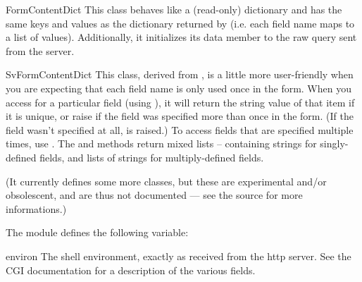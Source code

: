 \begin{funcdesc}{FormContentDict}{}
This class behaves like a (read-only) dictionary and has the same keys
and values as the dictionary returned by  (i.e. each
field name maps to a list of values).  Additionally, it initializes
its data member  to the raw query sent from the
server.
\end{funcdesc}

\begin{funcdesc}{SvFormContentDict}{}
This class, derived from , is a little more
user-friendly when you are expecting that each field name is only used
once in the form.  When you access for a particular field (using
), it will return the string value of that item
if it is unique, or raise  if the field was specified
more than once in the form.  (If the field wasn't specified at all,
 is raised.)  To access fields that are specified
multiple times, use .  The
 and  methods return mixed lists --
containing strings for singly-defined fields, and lists of strings for
multiply-defined fields.
\end{funcdesc}

(It currently defines some more classes, but these are experimental
and/or obsolescent, and are thus not documented --- see the source for
more informations.)

The module defines the following variable:

\begin{datadesc}{environ}
The shell environment, exactly as received from the http server.  See
the CGI documentation for a description of the various fields.
\end{datadesc}
